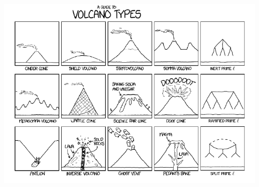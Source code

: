 \documentclass[10pt,a4paper]{beamer}
\theoremstyle{plain}
\theoremstyle{definition}
\theoremstyle{definition}
\theoremstyle{definition}
\theoremstyle{definition}
\theoremstyle{remark}
\theoremstyle{remark}
\begin{document}


% 

\begin{frame}
\begin{center}
\includegraphics[width=.9\hsize]{Images/volcan}
\end{center}
\end{frame}
\end{document}
